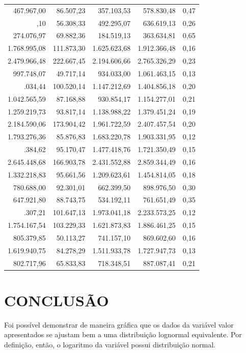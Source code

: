 \documentclass[a4paper]{article}
\begin{document}
\begin{table}
\begin{tabular}[t]{rrrrr}
467.967,00 & 86.507,23 & 357.103,53 & 578.830,48 & 0,47\\
\addlinespace
564.457,10 & 56.308,33 & 492.295,07 & 636.619,13 & 0,26\\
274.076,97 & 69.882,36 & 184.519,13 & 363.634,81 & 0,65\\
1.768.995,08 & 111.873,30 & 1.625.623,68 & 1.912.366,48 & 0,16\\
2.479.966,48 & 222.667,45 & 2.194.606,66 & 2.765.326,29 & 0,23\\
997.748,07 & 49.717,14 & 934.033,00 & 1.061.463,15 & 0,13\\
\addlinespace
1.276.034,44 & 100.520,14 & 1.147.212,69 & 1.404.856,18 & 0,20\\
1.042.565,59 & 87.168,88 & 930.854,17 & 1.154.277,01 & 0,21\\
1.259.219,73 & 93.817,14 & 1.138.988,22 & 1.379.451,24 & 0,19\\
2.184.590,06 & 173.904,42 & 1.961.722,59 & 2.407.457,54 & 0,20\\
1.793.276,36 & 85.876,83 & 1.683.220,78 & 1.903.331,95 & 0,12\\
\addlinespace
1.599.384,62 & 95.170,47 & 1.477.418,76 & 1.721.350,49 & 0,15\\
2.645.448,68 & 166.903,78 & 2.431.552,88 & 2.859.344,49 & 0,16\\
1.332.218,83 & 95.661,56 & 1.209.623,61 & 1.454.814,05 & 0,18\\
780.688,00 & 92.301,01 & 662.399,50 & 898.976,50 & 0,30\\
647.921,80 & 88.743,75 & 534.192,11 & 761.651,49 & 0,35\\
\addlinespace
2.103.307,21 & 101.647,13 & 1.973.041,18 & 2.233.573,25 & 0,12\\
1.754.167,54 & 103.229,33 & 1.621.873,83 & 1.886.461,25 & 0,15\\
805.379,85 & 50.113,27 & 741.157,10 & 869.602,60 & 0,16\\
1.619.940,75 & 84.278,29 & 1.511.933,78 & 1.727.947,73 & 0,13\\
802.717,96 & 65.833,83 & 718.348,51 & 887.087,41 & 0,21\\
\bottomrule
\end{tabular}
\end{table}

\section{CONCLUSÃO}\label{conclusao}

Foi possível demonstrar de maneira gráfica que os dados da variável
valor apresentados se ajustam bem a uma distribuição lognormal
equivalente. Por definição, então, o logaritmo da variável possui
distribuição normal.
\end{document}
